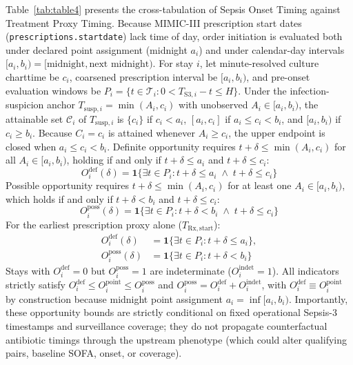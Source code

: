 \documentclass[10pt,twocolumn,a4paper]{article}
\begin{document}
Table~\ref{tab:table4} presents the cross-tabulation of Sepsis Onset Timing against Treatment Proxy Timing. Because MIMIC-III prescription start dates (\texttt{prescriptions.\allowbreak startdate}) lack time of day, order initiation is evaluated both under declared point assignment (midnight $a_i$) and under calendar-day intervals $[a_i, b_i) = [\text{midnight}, \text{next midnight})$. For stay $i$, let minute-resolved culture charttime be $c_i$, coarsened prescription interval be $[a_i, b_i)$, and pre-onset evaluation windows be $P_i = \{ t \in \mathcal{T}_i : 0 < T_{\mathrm{S3}, i} - t \le H \}$. Under the infection-suspicion anchor $T_{\mathrm{susp}, i} = \min(A_i, c_i)$ with unobserved $A_i \in [a_i, b_i)$, the attainable set $\mathcal{C}_i$ of $T_{\mathrm{susp}, i}$ is $\{c_i\}$ if $c_i < a_i$, $[a_i, c_i]$ if $a_i \le c_i < b_i$, and $[a_i, b_i)$ if $c_i \ge b_i$. Because $C_i = c_i$ is attained whenever $A_i \ge c_i$, the upper endpoint is closed when $a_i \le c_i < b_i$. Definite opportunity requires $t + \delta \le \min(A_i, c_i)$ for all $A_i \in [a_i, b_i)$, holding if and only if $t + \delta \le a_i$ and $t + \delta \le c_i$:
\begin{equation}
O_i^{\mathrm{def}}(\delta) = \mathbf{1} \bigl\{ \exists t \in P_i : t + \delta \le a_i \;\land\; t + \delta \le c_i \bigr\}
\end{equation}
Possible opportunity requires $t + \delta \le \min(A_i, c_i)$ for at least one $A_i \in [a_i, b_i)$, which holds if and only if $t + \delta < b_i$ and $t + \delta \le c_i$:
\begin{equation}
O_i^{\mathrm{poss}}(\delta) = \mathbf{1} \bigl\{ \exists t \in P_i : t + \delta < b_i \;\land\; t + \delta \le c_i \bigr\}
\end{equation}
For the earliest prescription proxy alone ($T_{\mathrm{Rx,start}}$):
\begin{equation}
\begin{aligned}
O_i^{\mathrm{def}}(\delta) &= \mathbf{1} \bigl\{ \exists t \in P_i : t + \delta \le a_i \bigr\}, \\
O_i^{\mathrm{poss}}(\delta) &= \mathbf{1} \bigl\{ \exists t \in P_i : t + \delta < b_i \bigr\}
\end{aligned}
\end{equation}
Stays with $O_i^{\mathrm{def}} = 0$ but $O_i^{\mathrm{poss}} = 1$ are indeterminate ($O_i^{\mathrm{indet}} = 1$). All indicators strictly satisfy $O_i^{\mathrm{def}} \le O_i^{\mathrm{point}} \le O_i^{\mathrm{poss}}$ and $O_i^{\mathrm{poss}} = O_i^{\mathrm{def}} + O_i^{\mathrm{indet}}$, with $O_i^{\mathrm{def}} \equiv O_i^{\mathrm{point}}$ by construction because midnight point assignment $a_i = \inf [a_i, b_i)$. Importantly, these opportunity bounds are strictly conditional on fixed operational Sepsis-3 timestamps and surveillance coverage; they do not propagate counterfactual antibiotic timings through the upstream phenotype (which could alter qualifying pairs, baseline SOFA, onset, or coverage).
\end{document}
